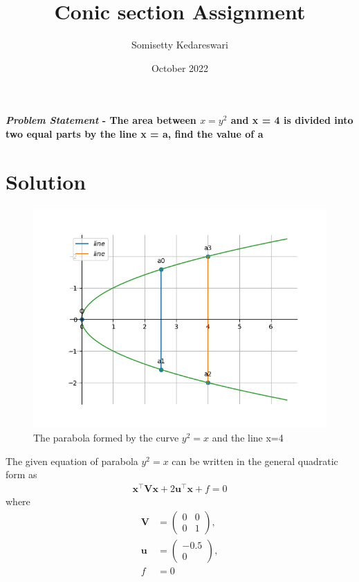 \documentclass[journal,10pt,twocolumn]{article}
\title{\textbf{Conic section Assignment}}
\author{Somisetty Kedareswari}
\date{October 2022}
\let\vec\mathbf
\newcommand{\myvec}[1]{\ensuremath{\begin{pmatrix}#1\end{pmatrix}}}
\begin{document}
\maketitle
\paragraph{\textit{Problem Statement} - The area between $x = y^2$ and x = 4 is divided into two equal parts by the line x = a, find the value of a}
\section*{\large Solution}

\begin{figure}[h]
\centering
\includegraphics[width=1\columnwidth]{conics1.png}

\caption{The parabola formed by the curve $y^2 = x$ and the line x=4}
\label{fig:parabola}
\end{figure}

The given equation of parabola $y^2 = x$ can be written in the general quadratic form as
\begin{align}
    \label{eq:conic_quad_form}
    \vec{x}^{\top}\vec{V}\vec{x}+2\vec{u}^{\top}\vec{x}+f=0
    \end{align}
where
\begin{align}
 \label{eq:V_matrix}
 \vec{V} &= \myvec{0 & 0\\0 & 1},
 \\
 \label{eq:u_vector}
 \vec{u} &= \myvec{-0.5\\ 0},
 \\
 \label{eq:f_value}
 f &= 0
\end{align}
\end{document}
